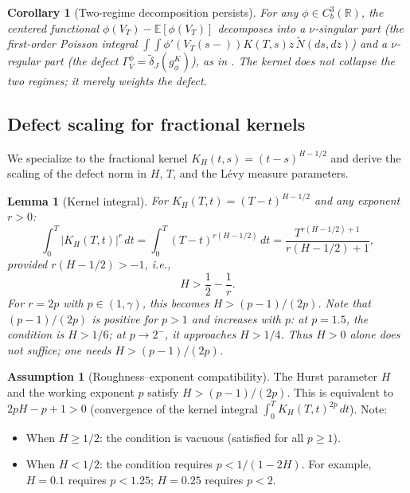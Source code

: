 \documentclass[11pt,a4paper]{article}
\theoremstyle{plain}
\newtheorem{lemma}[theorem]{Lemma}
\newtheorem{corollary}[theorem]{Corollary}
\theoremstyle{definition}
\newtheorem{assumption}[theorem]{Assumption}
\theoremstyle{remark}
\newcommand{\E}{\mathbb{E}}
\newcommand{\R}{\mathbb{R}}
\newcommand{\Ntilde}{\widetilde{N}}
\begin{document}
\begin{corollary}[Two-regime decomposition persists]
\label{cor:two-regime-persists}
For any $\phi \in C_b^3(\R)$, the centered functional
$\phi(V_T) - \E[\phi(V_T)]$ decomposes into a
$\nu$-singular part (the first-order Poisson integral
$\int\!\!\int \phi'(V_T(s\!-\!))K(T,s)z\,\Ntilde(ds,dz)$)
and a $\nu$-regular part (the defect
$\Gamma_V^\phi = \widetilde{\delta}_J(g_\phi^K)$),
as in .  The kernel does not collapse
the two regimes; it merely weights the defect.
\end{corollary}


\subsection{Defect scaling for fractional kernels}

We specialize to the fractional kernel
$K_H(t,s) = (t-s)^{H-1/2}$ and derive the scaling of the
defect norm in $H$, $T$, and the L\'evy measure parameters.

\begin{lemma}[Kernel integral]\label{lem:kernel-integral}
For $K_H(T,t) = (T-t)^{H-1/2}$ and any exponent $r > 0$:
\begin{equation}\label{eq:kernel-integral}
  \int_0^T |K_H(T,t)|^r\,dt
  = \int_0^T (T-t)^{r(H-1/2)}\,dt
  = \frac{T^{r(H-1/2)+1}}{r(H-1/2)+1},
\end{equation}
provided $r(H - 1/2) > -1$, i.e.,
\begin{equation}\label{eq:H-condition}
  H > \frac{1}{2} - \frac{1}{r}.
\end{equation}
For $r = 2p$ with $p \in (1,\gamma)$, this
becomes $H > (p-1)/(2p)$.  Note that $(p-1)/(2p)$ is
\emph{positive} for $p > 1$ and increases with $p$:
at $p = 1.5$, the condition is $H > 1/6$; at $p \to 2^-$,
it approaches $H > 1/4$.  Thus $H > 0$ alone does
\emph{not} suffice; one needs $H > (p-1)/(2p)$.
\end{lemma}

\begin{assumption}[Roughness--exponent compatibility]
\label{ass:Hp}
The Hurst parameter $H$ and the working exponent $p$
satisfy $H > (p-1)/(2p)$.  This is equivalent to
$2pH - p + 1 > 0$ (convergence of the kernel integral
$\int_0^T K_H(T,t)^{2p}\,dt$).  Note:
\begin{itemize}
\item When $H \geq 1/2$: the condition is vacuous
  (satisfied for all $p \geq 1$).
\item When $H < 1/2$: the condition requires
  $p < 1/(1 - 2H)$.  For example, $H = 0.1$ requires
  $p < 1.25$; $H = 0.25$ requires $p < 2$.
\end{itemize}
\end{assumption}
\end{document}
